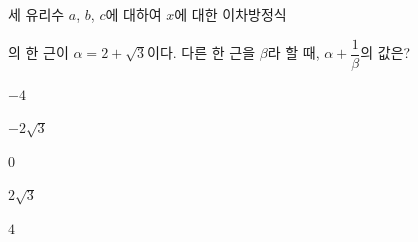 세 유리수 $a$, $b$, $c$에 대하여 $x$에 대한 이차방정식\par\smallskip{}\par\smallskip\noindent 의 한 근이 $\alpha=2+\sqrt{3}$이다. 다른 한 근을 $\beta$라 할 때, $\alpha+\dfrac{1}{\beta}$의 값은?
\begin{choices32}{\rule[-3ex]{0pt}{8ex}$-4$}{\rule[-3ex]{0pt}{8ex}$-2\sqrt{3}$}{\rule[-3ex]{0pt}{8ex}$0$}{\rule[-3ex]{0pt}{8ex}$2\sqrt{3}$}{\rule[-3ex]{0pt}{8ex}$4$}\end{choices32}
